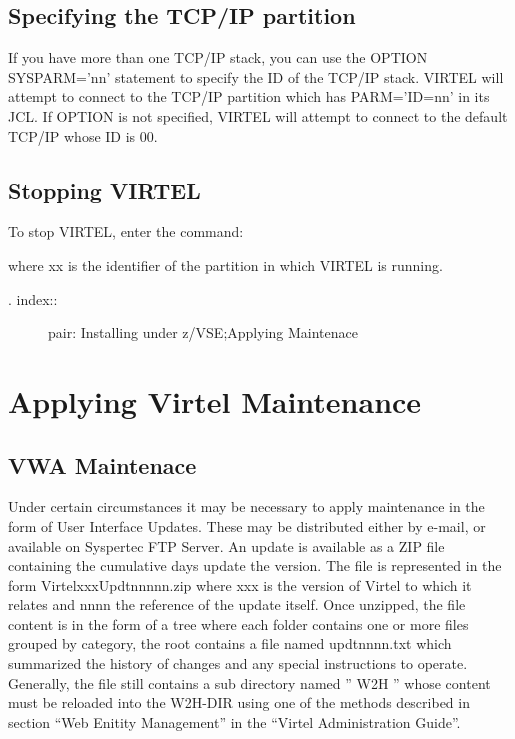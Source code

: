 \documentclass[letterpaper,10pt,english]{sphinxmanual}
\begin{document}
\subsection{Specifying the TCP/IP partition}
\label{\detokenize{Installation_Guide:specifying-the-tcp-ip-partition}}
If you have more than one TCP/IP stack, you can use the OPTION SYSPARM=’nn’ statement to specify the ID of the TCP/IP stack. VIRTEL will attempt to connect to the TCP/IP partition which has PARM=’ID=nn’ in its JCL. If OPTION is not specified, VIRTEL will attempt to connect to the default TCP/IP whose ID is 00.


\subsection{Stopping VIRTEL}
\label{\detokenize{Installation_Guide:id2}}
To stop VIRTEL, enter the command:

\begin{sphinxVerbatim}[commandchars=\\\{\}]
 
\end{sphinxVerbatim}

where xx is the identifier of the partition in which VIRTEL is running.
\begin{description}
\item[{. index::}] \leavevmode
pair: Installing under z/VSE;Applying Maintenace

\end{description}


\section{Applying Virtel Maintenance}
\label{\detokenize{Installation_Guide:applying-virtel-maintenance}}

\subsection{VWA Maintenace}
\label{\detokenize{Installation_Guide:vwa-maintenace}}
Under certain circumstances it may be necessary to apply maintenance in the form of User Interface Updates. These may be distributed either by e-mail, or available on Syspertec FTP Server.
An update is available as a ZIP file containing the cumulative days update the version. The file is represented in the form VirtelxxxUpdtnnnnn.zip where xxx is the version of Virtel to which it relates and nnnn the reference of the update itself. Once unzipped, the file content is in the form of a tree where each folder contains one or more files grouped by category, the root contains a file named updtnnnn.txt which summarized the history of changes and any special instructions to operate. Generally, the file still contains a sub directory named ” W2H ” whose content must be reloaded into the W2H-DIR using one of the methods described in section “Web Enitity Management” in the “Virtel Administration Guide”.
\end{document}

